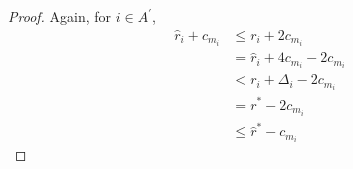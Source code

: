 \begin{proof}
  Again, for ${i} \in A^{'}$, 
  \begin{align*}
\hat{r}_{i} + c_{m_{i}}&\leq r_{i} + 2c_{m_{i}} \\
&= \hat{r}_{i} + 4c_{m_{i}} - 2c_{m_{i}} \\
 &< r_{i} + \Delta_{i} - 2c_{m_{i}}\\
 &= r^{*} -2c_{m_{i}} \\
 &\leq \hat{r}^{*} - c_{m_{i}}
  \end{align*}


% 
 

\end{proof}
